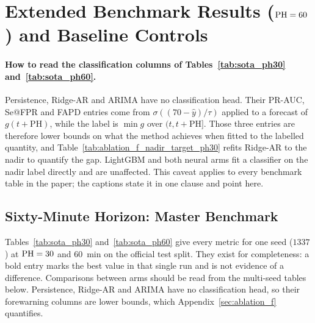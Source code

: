 \section{Extended Benchmark Results (\texorpdfstring{$\mathrm{PH} = 60$}{PH = 60}) and Baseline Controls}
\label{app:benchmarks}

\paragraph*{How to read the classification columns of Tables~\ref{tab:sota_ph30}
and~\ref{tab:sota_ph60}.} Persistence, Ridge-AR and ARIMA have no classification
head. Their PR-AUC, Se@FPR and FAPD entries come from
$\sigma((70 - \hat{y})/\tau)$ applied to a forecast of $g(t{+}\mathrm{PH})$,
while the label is $\min g$ over $(t, t{+}\mathrm{PH}]$. Those three entries are
therefore lower bounds on what the method achieves when fitted to the labelled
quantity, and Table~\ref{tab:ablation_f_nadir_target_ph30} refits Ridge-AR to the
nadir to quantify the gap. LightGBM and both neural arms fit a classifier on the
nadir label directly and are unaffected. This caveat applies to every benchmark
table in the paper; the captions state it in one clause and point here.

\subsection{Sixty-Minute Horizon: Master Benchmark}
\label{sec:appendix_benchmarks}

\begingroup
\renewenvironment{table*}[1][]{\begin{table}}{\end{table}}


\endgroup

Tables~\ref{tab:sota_ph30} and~\ref{tab:sota_ph60} give every metric for one
seed ($1337$) at $\mathrm{PH} = 30$ and $60$~min on the official test split. They exist
for completeness: a bold entry marks the best value in that single run and is
not evidence of a difference. Comparisons between arms should be read from the
multi-seed tables below. Persistence, Ridge-AR and ARIMA have no classification
head, so their forewarning columns are lower bounds, which
Appendix~\ref{sec:ablation_f} quantifies.

